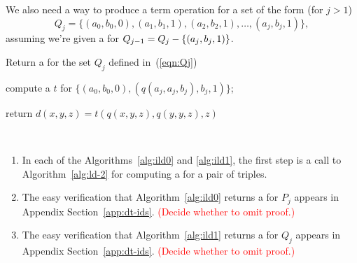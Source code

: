   
  We also need a way to produce a \ld
  term operation for a set of the form  (for $j>1$)
  \begin{equation}
  \label{eqn:Qj}
  Q_{j} = \{(a_0, b_0, 0), (a_1, b_1, 1), (a_2, b_2, 1), \dots,
  (a_{j}, b_{j}, 1)\},
  \end{equation}
  assuming we're given a \ldto for
  $Q_{j-1} = Q_j - \{(a_j, b_j, 1)\}$.
  
  \LinesNumbered
  \begin{algorithm}%
    \caption{Return a \ldto for the set $Q_j$ defined in~(\ref{eqn:Qj})
    \label{alg:ild1}}
  
    compute a \ldto $t$ for $\{(a_0, b_0, 0), (q(a_j, a_j, b_j), b_j, 1)\}$;
  
    return $d(x,y,z) = t(q(x,y,z), q(y,y,z), z)$
  \end{algorithm}
  
  \begin{remarks}\
  \begin{enumerate}[1.]
  \item In each of the Algorithms~\ref{alg:ild0} and \ref{alg:ild1},
  the first step is a call to Algorithm~\ref{alg:ld-2}
  for computing a \ldto for a pair of triples.
  \item The easy verification that Algorithm~\ref{alg:ild0} returns
  a \ldto for $P_j$ appears in Appendix Section~\ref{app:dt-ids}.
  \textcolor{red}{(Decide whether to omit proof.)}
  \item The easy verification that Algorithm~\ref{alg:ild1} returns
  a \ldto for $Q_j$ appears in Appendix Section~\ref{app:dt-ids}.
  \textcolor{red}{(Decide whether to omit proof.)}
  \end{enumerate}
  \end{remarks}
  
  
  
  
  
  
  
  
  
  
  
  
  
  
  
  
  
  
  
  
  
  
  
